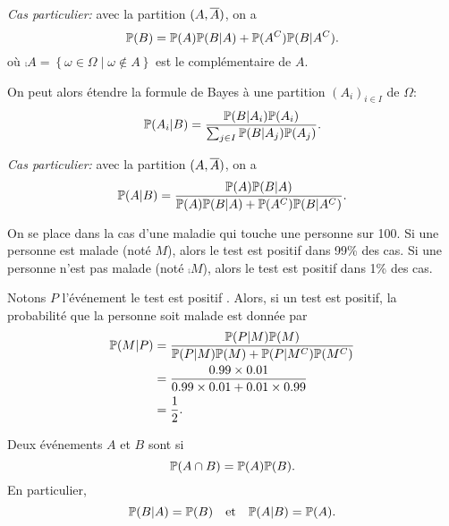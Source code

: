 \emph{Cas particulier:} avec la partition \((A,\overline{A})\), on a
\begin{equation*}
    \mathbb{P}(B) = \mathbb{P}(A)\mathbb{P}(B|A) + \mathbb{P}({A}^C)\mathbb{P}(B|{A}^C).
\end{equation*}
où \(\comp A = \left\{\omega\in\Omega\mid \omega\notin A\right\}\) est le complémentaire de \(A\).

On peut alors étendre la formule de Bayes à une partition \((A_i)_{i\in I}\) de \(\Omega\):
\begin{equation*}
    \mathbb{P}(A_i|B) = \frac{\mathbb{P}(B|A_i)\mathbb{P}(A_i)}{\sum_{j\in I} \mathbb{P}(B|A_j)\mathbb{P}(A_j)}.
\end{equation*}

\emph{Cas particulier:} avec la partition \((A,\overline{A})\), on a
\begin{equation*}
    \mathbb{P}(A|B) = \frac{\mathbb{P}(A)\mathbb{P}(B|A)}{\mathbb{P}(A)\mathbb{P}(B|A) + \mathbb{P}({A}^C)\mathbb{P}(B|{A}^C)}.
\end{equation*}

\begin{example}
    On se place dans la cas d'une maladie qui touche une personne sur 100.
    Si une personne est malade (noté \(M\)), alors le test est positif dans 99\% des cas.
    Si une personne n'est pas malade (noté \(\comp M\)), alors le test est positif dans 1\% des cas.

    Notons \(P\) l'événement \og{} le test est positif \fg{}. Alors, si un test est positif,
    la probabilité que la personne soit malade est donnée par
    \begin{equation*}
        \begin{aligned}
            \mathbb{P}(M|P) 
            &= \frac{\mathbb{P}(P|M)\mathbb{P}(M)}{\mathbb{P}(P|M)\mathbb{P}(M) + \mathbb{P}(P|{M}^C)\mathbb{P}({M}^C)}\\
            &= \frac{0.99\times 0.01}{0.99\times 0.01 + 0.01\times 0.99}\\
            &= \frac{1}{2}.
        \end{aligned}
    \end{equation*}
\end{example}

\begin{definition}
    Deux événements \(A\) et \(B\) sont  si
    \begin{equation*}
        \mathbb{P}(A\cap B) = \mathbb{P}(A)\mathbb{P}(B).
    \end{equation*}
    En particulier,
    \begin{equation*}
        \mathbb{P}(B|A) = \mathbb{P}(B) \quad \text{et} \quad \mathbb{P}(A|B) = \mathbb{P}(A).
    \end{equation*}
\end{definition}

